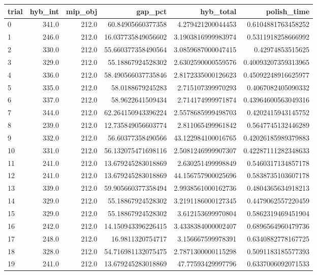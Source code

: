 \begin{tabular}{lrrrrr}
\hline
trial & hyb_int & mip_obj & gap_pct & hyb_total & polish_time \\ \hline
0 & 341.0 & 212.0 & 60.84905660377358 & 4.279421200044453 & 0.6104881763458252 \\
1 & 246.0 & 212.0 & 16.037735849056602 & 3.1903816999983974 & 0.5311918258666992 \\
2 & 330.0 & 212.0 & 55.660377358490564 & 3.0859687000047415 & 0.42974853515625 \\
3 & 329.0 & 212.0 & 55.18867924528302 & 2.6302590000559576 & 0.40093207359313965 \\
4 & 336.0 & 212.0 & 58.490566037735846 & 2.8172335000126623 & 0.45092248916625977 \\
5 & 335.0 & 212.0 & 58.0188679245283 & 2.715107399970293 & 0.4067082405090332 \\
6 & 337.0 & 212.0 & 58.9622641509434 & 2.714174999971874 & 0.43964600563049316 \\
7 & 344.0 & 212.0 & 62.264150943396224 & 2.5578685999498703 & 0.4202415943145752 \\
8 & 239.0 & 212.0 & 12.735849056603774 & 2.811065499961842 & 0.5647745132446289 \\
9 & 332.0 & 212.0 & 56.60377358490566 & 43.122984100016765 & 0.42026185989379883 \\
10 & 331.0 & 212.0 & 56.132075471698116 & 2.5081246999907307 & 0.42287111282348633 \\
11 & 241.0 & 212.0 & 13.679245283018869 & 2.630251499998849 & 0.5460317134857178 \\
12 & 241.0 & 212.0 & 13.679245283018869 & 44.156757900025696 & 0.5838735103607178 \\
13 & 339.0 & 212.0 & 59.905660377358494 & 2.9938561000162736 & 0.4804365634918213 \\
14 & 329.0 & 212.0 & 55.18867924528302 & 3.2191186000127345 & 0.4479062557220459 \\
15 & 329.0 & 212.0 & 55.18867924528302 & 3.612153699970804 & 0.5862319469451904 \\
16 & 242.0 & 212.0 & 14.150943396226415 & 3.4338384000002407 & 0.6896564960479736 \\
17 & 248.0 & 212.0 & 16.9811320754717 & 3.156667599978391 & 0.6340882778167725 \\
18 & 328.0 & 212.0 & 54.716981132075475 & 2.7871300000115298 & 0.5091183185577393 \\
19 & 241.0 & 212.0 & 13.679245283018869 & 47.77593429997796 & 0.6337006092071533 \\
\hline
\end{tabular}
